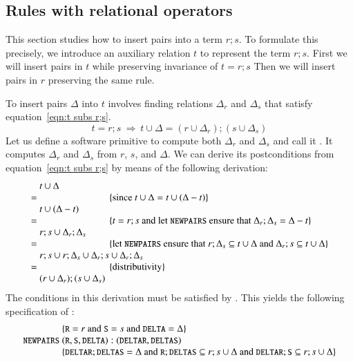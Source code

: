 \documentclass{elsarticle}
\begin{document}
\subsection{Rules with relational operators}
	This section studies how to insert pairs into a term $r;s$.
	To formulate this precisely, we introduce an auxiliary relation $t$ to represent the term $r;s$.
	First we will insert pairs in $t$ while preserving invariance of $t=r;s$
	Then we will insert pairs in $r$ preserving the same rule.

	To insert pairs $\Delta$ into $t$ involves finding relations $\Delta_r$ and $\Delta_s$
	that satisfy equation~\ref{eqn:t subs r;s}.
\begin{equation}
t=r;s\ \Rightarrow\ t\cup\Delta=(r\cup \Delta_r);(s\cup \Delta_s)\label{eqn:t subs r;s}
\end{equation}
	Let us define a software primitive to compute both $\Delta_r$ and $\Delta_s$ and call it .
	It computes $\Delta_r$ and $\Delta_s$ from $r$, $s$, and $\Delta$.
	We can derive its postconditions from equation~\ref{eqn:t subs r;s} by means of the following derivation:
\[\begin{array}{r@{~}l}
&t\cup\Delta\\
=&\hspace{1in}\{\text{since }t\cup\Delta=t\cup(\Delta-t)\}\\
&t\cup(\Delta-t)\\
=&\hspace{1in}\{t=r;s\text{ and let \code{NEWPAIRS} ensure that }\Delta_r;\Delta_s=\Delta-t\}\\
&r;s\cup\Delta_r;\Delta_s\\
=&\hspace{1in}\{\text{let \code{NEWPAIRS} ensure that }r;\Delta_s\subs t\cup\Delta\text{ and }\Delta_r;s\subs t\cup\Delta\}\\
&r;s\cup r;\Delta_s\cup \Delta_r;s\cup \Delta_r;\Delta_s\\
=&\hspace{1in}\{\text{distributivity}\}\\
&(r\cup \Delta_r);(s\cup \Delta_s)
\end{array}\]
	The conditions in this derivation must be satisfied by . 
	This yields the following specification of :
\[\begin{array}{r@{~}l}
&\{\code{R}=r\text{ and }\code{S}=s\text{ and }\code{DELTA}=\Delta\}\\
\code{NEWPAIRS}&(\code{R}, \code{S}, \code{DELTA}): (\code{DELTAR}, \code{DELTAS})\\
&\{\code{DELTAR};\code{DELTAS}=\Delta\text{ and }\code{R};\code{DELTAS}\subs r;s\cup\Delta\text{ and }\code{DELTAR};\code{S}\subs r;s\cup\Delta\}
\end{array}\]
\end{document}

